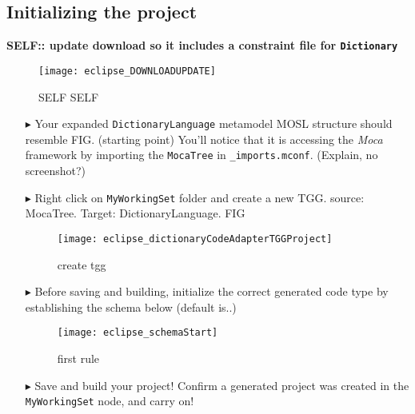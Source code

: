 \newpage
\hypertarget{initialize tex}{}
\subsection{Initializing the project}
\texHeader

{\bf SELF:: update download so it includes a constraint file for \texttt{Dictionary}}
\begin{figure}[htbp]
\begin{center}
  \texttt{[image: eclipse\_DOWNLOADUPDATE]}
  \caption{SELF SELF}
\end{center}
\end{figure}

\begin{enumerate}

\item[$\blacktriangleright$] Your expanded \texttt{DictionaryLanguage} metamodel MOSL structure should resemble FIG. (starting point) You'll notice that it is
accessing the \emph{Moca} framework by importing the \texttt{MocaTree} in \texttt{\_imports.mconf}. (Explain, no screenshot?)

\item[$\blacktriangleright$] Right click on \texttt{MyWorkingSet} folder and create a new TGG. source: MocaTree. Target: DictionaryLanguage. FIG

\begin{figure}[htbp]
\begin{center}
  \texttt{[image: eclipse\_dictionaryCodeAdapterTGGProject]}
  \caption{create tgg}
  \label{eclipse:newTGGProject}
\end{center}
\end{figure}


\item[$\blacktriangleright$] Before saving and building, initialize the correct generated code type by establishing the schema below (default is..)

\begin{figure}[htbp]
\begin{center}
  \texttt{[image: eclipse\_schemaStart]}
  \caption{first rule}
  \label{eclipse:firstSchema}
\end{center}
\end{figure}

\item[$\blacktriangleright$] Save and build your project! Confirm a generated project was created in the \texttt{MyWorkingSet} node, and carry on!

\end{enumerate}
